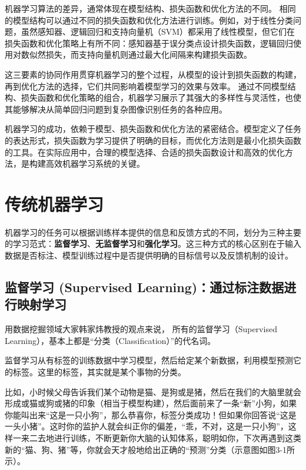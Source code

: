 机器学习算法的差异，通常体现在模型结构、损失函数和优化方法的不同。
相同的模型结构可以通过不同的损失函数和优化方法进行训练。例如，对于线性分类问题，虽然感知器、逻辑回归和支持向量机（SVM）都采用了线性模型，但它们在损失函数和优化策略上有所不同：感知器基于误分类点设计损失函数，逻辑回归使用对数似然损失，而支持向量机则通过最大化间隔来构建损失函数。

这三要素的协同作用贯穿机器学习的整个过程，从模型的设计到损失函数的构建，再到优化方法的选择，它们共同影响着模型学习的效果与效率。
通过不同模型结构、损失函数和优化策略的组合，机器学习展示了其强大的多样性与灵活性，也使其能够解决从简单回归问题到复杂图像识别任务的各种应用。

机器学习的成功，依赖于模型、损失函数和优化方法的紧密结合。模型定义了任务的表达形式，损失函数为学习提供了明确的目标，而优化方法则是最小化损失函数的工具。在实际应用中，合理的模型选择、合适的损失函数设计和高效的优化方法，是构建高效机器学习系统的关键。

 \section{传统机器学习}


机器学习的任务可以根据训练样本提供的信息和反馈方式的不同，划分为三种主要的学习范式：{\bf 监督学习}、{\bf 无监督学习}和{\bf 强化学习}。这三种方式的核心区别在于输入数据是否标注、模型训练过程中是否提供明确的目标信号以及反馈机制的设计。

\subsection{ 监督学习 (Supervised Learning)：通过标注数据进行映射学习}

用数据挖掘领域大家韩家炜教授的观点\cite{han2011data}来说，
所有的监督学习（Supervised Learning），基本上都是“分类（Classification）”的代名词。

监督学习从有标签的训练数据中学习模型，然后给定某个新数据，利用模型预测它的标签。这里的标签，其实就是某个事物的分类。

比如，小时候父母告诉我们某个动物是猫、是狗或是猪，然后在我们的大脑里就会形成或猫或狗或猪的印象（相当于模型构建），然后面前来了一条“新”小狗，如果你能叫出来“这是一只小狗”，那么恭喜你，标签分类成功！但如果你回答说“这是一头小猪”。这时你的监护人就会纠正你的偏差，“乖，不对，这是一只小狗”，这样一来二去地进行训练，不断更新你大脑的认知体系，聪明如你，下次再遇到这类新的“猫、狗、猪”等，你就会天才般地给出正确的“预测”分类（示意图如图3-1所示）。

